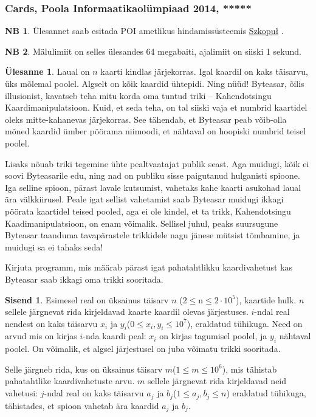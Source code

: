 \documentclass{trkut}
\theoremstyle{definition}
\newtheorem*{extra}{NB}
\newtheorem*{Input}{Sisend}
\newtheorem*{Text}{Ülesanne}
\begin{document}
\subsubsection{Cards, Poola Informaatikaolümpiaad 2014, *****}
\begin{extra}
Ülesannet saab esitada POI ametlikus hindamissüsteemis \href{https://szkopul.edu.pl/problemset/problem/qpsk3ygf8MU7D_1Es0oc_xd8/site/?key=statement}{Szkopuł} .
\end{extra}
\begin{extra}
Mälulimiit on selles ülesandes 64 megabaiti, ajalimiit on siiski 1 sekund.
\end{extra}
\begin{Text}
Laual on $n$ kaarti kindlas järjekorras. Igal kaardil on kaks täisarvu, üks mõlemal poolel.
Algselt on kõik kaardid ühtepidi. Ning nüüd! Byteasar,  õilis illusionist, kavatseb teha mitu korda oma tuntud triki -- Kahendotsingu Kaardimanipulatsioon. 
Kuid, et seda teha, on tal siiski vaja et numbrid kaartidel oleks mitte-kahanevas järjekorras. See tähendab, et Byteasar peab võib-olla mõned kaardid ümber pöörama niimoodi, et nähtaval on hoopiski numbrid teisel poolel.

Lisaks nõuab triki tegemine ühte pealtvaatajat publik seast. Aga muidugi, kõik ei soovi Byteasarile edu, ning nad on publiku sisse paigutanud hulganisti spioone. 
Iga selline spioon, pärast lavale kutsumist, vahetaks kahe kaarti asukohad laual ära välkkiirusel. Peale igat sellist vahetamist saab Byteasar muidugi ikkagi pöörata kaartidel teised pooled, aga ei ole kindel, et ta trikk, Kahendotsingu Kaadimanipulatsioon, on enam võimalik. Sellisel juhul, peaks suursugune Byteasar taanduma tavapärastele trikkidele nagu jänese mütsist tõmbamine, ja muidugi sa ei tahaks seda!

Kirjuta programm, mis määrab pärast igat pahatahtlikku kaardivahetust kas Byteasar saab ikkagi oma trikki sooritada.

\parencite{12}
\end{Text}
\begin{Input}
Esimesel real on üksainus täisarv $n$ ($2\le $n$\le 2\cdot 10^5$), kaartide hulk. 
$n$ sellele järgnevat rida kirjeldavad kaarte kaardil olevas järjestuses. $i$-ndal real nendest on kaks täisarvu $x_i$ ja $y_i$($0\le x_i, y_i\le 10^7$), eraldatud tühikuga. Need on arvud mis on kirjas $i$-nda kaardi peal: $x_i$ on kirjas tagumisel poolel, ja $y_i$ nähtaval poolel.
On võimalik, et algsel järjestusel on juba võimatu trikki sooritada.

Selle järgneb rida, kus on üksainus täisarv $m$($1\le m\le 10^6$), mis tähistab pahatahtlike kaardivahetuste arvu. $m$ sellele järgnevat rida kirjeldavad neid vahetusi: $j$-ndal real on kaks täisarvu $a_j$ ja $b_j$($1\le a_j, b_j\le n$) eraldatud tühikuga, tähistades, et spioon vahetab ära kaardid $a_j$ ja $b_j$.
\end{Input}
\end{document}
